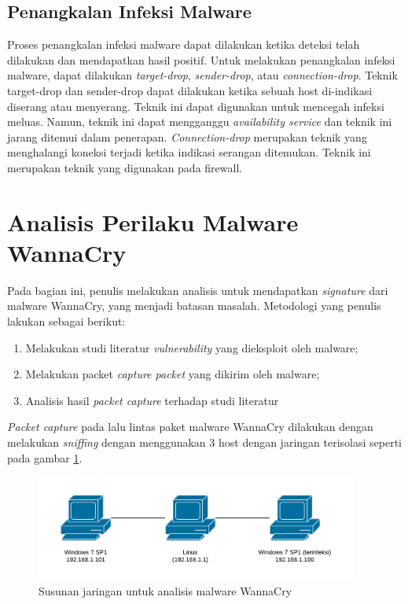 \subsection{Penangkalan Infeksi Malware}

Proses penangkalan infeksi malware dapat dilakukan ketika deteksi telah dilakukan dan mendapatkan hasil positif. Untuk melakukan penangkalan infeksi malware, dapat dilakukan \textit{target-drop}, \textit{sender-drop}, atau \textit{connection-drop}. Teknik target-drop dan sender-drop dapat dilakukan ketika sebuah host di-indikasi diserang atau menyerang. Teknik ini dapat digunakan untuk mencegah infeksi meluas. Namun, teknik ini dapat mengganggu \textit{availability service} dan teknik ini jarang ditemui dalam penerapan. \textit{Connection-drop} merupakan teknik yang menghalangi koneksi terjadi ketika indikasi serangan ditemukan. Teknik ini merupakan teknik yang digunakan pada firewall.

\section{Analisis Perilaku Malware WannaCry}

Pada bagian ini, penulis melakukan analisis untuk mendapatkan \textit{signature} dari malware WannaCry, yang menjadi batasan masalah. Metodologi yang penulis lakukan sebagai berikut:

\begin{enumerate}
	\item {Melakukan studi literatur \textit{vulnerability} yang dieksploit oleh malware;}
	\item {Melakukan packet \textit{capture packet} yang dikirim oleh malware;}
	\item {Analisis hasil \textit{packet capture} terhadap studi literatur}
\end{enumerate}

\textit{Packet capture} pada lalu lintas paket malware WannaCry dilakukan dengan melakukan \textit{sniffing} dengan menggunakan 3 host dengan jaringan terisolasi seperti pada gambar \ref{fig:analisis_malware_net}.

\begin{figure}[H]
	\centering
	\includegraphics[width=400px]{resources/analisis_malware_net.png}
	\caption{Susunan jaringan untuk analisis malware WannaCry}
	\label{fig:analisis_malware_net}
\end{figure}

